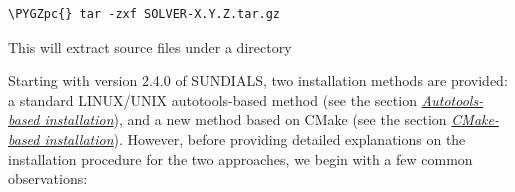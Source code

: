 \documentclass[letterpaper,10pt,english]{sphinxmanual}
\def\PYGZpc{\char`\%}
\begin{document}
\begin{Verbatim}[commandchars=\\\{\}]
\PYGZpc{} tar -zxf SOLVER-X.Y.Z.tar.gz
\end{Verbatim}

This will extract source files under a directory 

Starting with version 2.4.0 of SUNDIALS, two installation methods are
provided: a standard LINUX/UNIX autotools-based method (see the
section {\hyperref[Install:installation-autotools]{\emph{Autotools-based installation}}}), and a new method based on
CMake (see the section {\hyperref[Install:installation-cmake]{\emph{CMake-based installation}}}).  However,
before providing detailed explanations on the installation procedure
for the two approaches, we begin with a few common observations:
\end{document}
